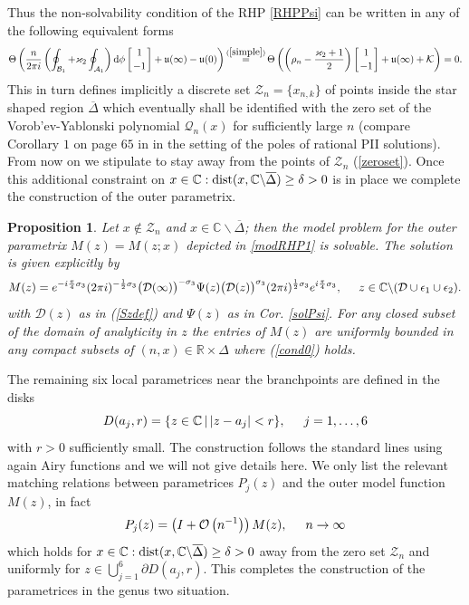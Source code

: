 \documentclass[10pt,oneside,reqno]{amsart}
\numberwithin{equation}{section}
\renewcommand{\d}{{\mathrm d}}
\newtheorem{proposition}[theorem]{Proposition}
\def\le{\left}
\def\ri{\right}
\def\bp{\begin{proposition}}
\def\ep{\end{proposition}}
\def\R{{\mathbb R}}
\def\u{\mathfrak u}
\def\eqref#1{(\ref{#1})}
\begin{document}
Thus the non-solvability condition of the RHP \ref{RHPPsi} can be written in any of the following equivalent forms
\begin{equation}\label{zeroset}
 \Theta\left(
 \frac {n}{2\pi i} \le(\oint_{\mathcal B_1} + \varkappa_2 \oint_{\mathcal A_1}\ri)\d\phi \le[{1 \atop -1}\ri] + \u(\infty)-\u(0)
 \right)\mathop{=}^{\eqref{simple}}\Theta\left(
 \le(\rho_n - \frac {\varkappa_2+1}2\ri) \le[{1\atop -1}\ri]+\mathfrak{u}(\infty)+\mathcal{K}
 \right)=0.
\end{equation}
This in turn defines implicitly a discrete set $\mathcal Z_{n} = \{x_{n,k}\}$ of points inside the star shaped region $\overline{\Delta}$ which eventually shall be identified with  the zero set of the Vorob'ev-Yablonski polynomial
$\mathcal{Q}_n(x)$ for sufficiently large $n$ (compare Corollary $1$ on page $65$ in \cite{BM} in the setting of the poles of rational PII solutions). From now on we stipulate to stay away from the points of $\mathcal Z_n$ \eqref{zeroset}. Once
this additional constraint on $x\in\mathbb{C}:\textnormal{dist}(x,\mathbb{C}\backslash\overline{\Delta})\geq\delta>0$ is in place we complete the construction of the outer
parametrix.
\bp 
Let $x\not \in \mathcal Z_n$ and $x\in\mathbb{C}\backslash\overline{\Delta}$; then the model problem for the outer parametrix $M(z)=M(z;x)$ depicted in \ref{modRHP1} is solvable. The solution is given explicitly by
\begin{equation*}
 M(z) = e^{-i\frac{\pi}{4}\sigma_3}(2\pi i)^{-\frac{1}{2}\sigma_3}\big(\mathcal{D}(\infty)\big)^{-\sigma_3}
  \Psi(z)
  \big(\mathcal{D}(z)\big)^{\sigma_3}(2\pi i)^{\frac{1}{2}\sigma_3}e^{i\frac{\pi}{4}\sigma_3},\hspace{0.5cm}z\in\mathbb{C}\backslash(\mathcal{D}\cup \epsilon_1\cup \epsilon_2).
\end{equation*}
with $\mathcal{D}(z)$ as in \eqref{Szdef} and $\Psi(z)$ as in Cor. \ref{solPsi}.
For any closed subset of the domain of analyticity in $z$ the entries of $M(z)$ are uniformly bounded in any compact subsets of $(n,x)\in \R\times  \Delta$ where \eqref{cond0} holds. 
\ep

The remaining six local parametrices near the branchpoints are defined in the disks 
\begin{equation*}
  D(a_j,r) = \{z\in\mathbb{C}\,|\, |z-a_j|<r\},\hspace{0.5cm} j=1,\ldots,6
\end{equation*}
with $r>0$ sufficiently small. The construction follows the standard lines using again Airy functions and we will not give details here. We only list the relevant matching relations
between parametrices $P_j(z)$ and the outer model function $M(z)$, in fact
\begin{equation}\label{matchgen2}
  P_j(z) = \left(I+\mathcal O\left(n^{-1}\right)\right)M(z),\hspace{0.5cm}n\rightarrow\infty
\end{equation}
which holds for $x\in\mathbb{C}:\textnormal{dist}(x,\mathbb{C}\backslash\overline{\Delta})\geq\delta>0$ away from the zero set $\mathcal{Z}_n$ and uniformly 
for $z\in\bigcup_{j=1}^6\partial D(a_j,r)$. This completes the construction of the parametrices in the genus two situation.
%
%
%
\end{document}
